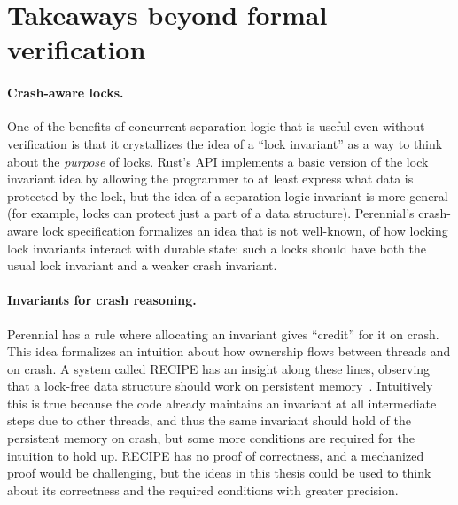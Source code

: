 \section{Takeaways beyond formal verification}

\paragraph{Crash-aware locks.} One of the benefits of concurrent separation
logic that is useful even without verification is that it crystallizes the idea
of a ``lock invariant'' as a way to think about the \emph{purpose} of locks.
Rust's  API implements a basic version of the lock invariant
idea by allowing the programmer to at least express what data is protected by
the lock, but the idea of a separation logic invariant is more general (for
example, locks can protect just a part of a data structure). Perennial's
crash-aware lock specification formalizes an idea that is not well-known, of how
locking lock invariants interact with durable state: such a locks should have
both the usual lock invariant and a weaker crash invariant.

\paragraph{Invariants for crash reasoning.} Perennial has a rule where
allocating an invariant gives ``credit'' for it on crash. This idea formalizes
an intuition about how ownership flows between threads and on crash. A system
called RECIPE has an insight along these lines, observing that a lock-free data
structure should work on persistent memory~\cite{lee:recipe}. Intuitively this
is true because the code already maintains an invariant at all intermediate
steps due to other threads, and thus the same invariant should hold of the
persistent memory on crash, but some more conditions are required for the
intuition to hold up. RECIPE has no proof of correctness, and a mechanized proof
would be challenging, but the ideas in this thesis could be used to think about
its correctness and the required conditions with greater precision.
